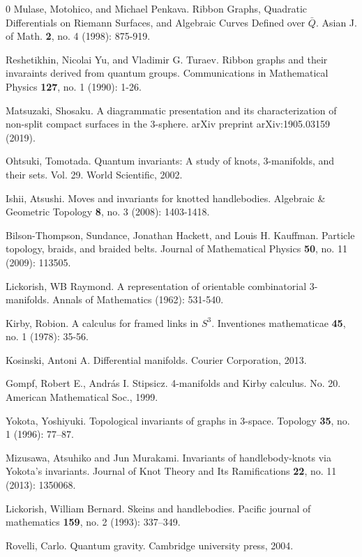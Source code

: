 \documentclass[aps,nofootinbib,amsfonts,superscriptaddress]{revtex4}
\begin{document}
\begin{thebibliography}{0}
Mulase, Motohico, and Michael Penkava. Ribbon Graphs, Quadratic Differentials on Riemann Surfaces, and Algebraic Curves Defined over $\bar Q$. Asian J. of Math. {\bf 2}, no. 4 (1998): 875-919.

Reshetikhin, Nicolai Yu, and Vladimir G. Turaev. Ribbon graphs and their invaraints derived from quantum groups. Communications in Mathematical Physics {\bf 127}, no. 1 (1990): 1-26.

Matsuzaki, Shosaku. A diagrammatic presentation and its characterization of non-split compact surfaces in the 3-sphere. arXiv preprint arXiv:1905.03159 (2019).

Ohtsuki, Tomotada. Quantum invariants: A study of knots, 3-manifolds, and their sets. Vol. 29. World Scientific, 2002.

Ishii, Atsushi. Moves and invariants for knotted handlebodies. Algebraic \& Geometric Topology {\bf 8}, no. 3 (2008): 1403-1418.

Bilson-Thompson, Sundance, Jonathan Hackett, and Louis H. Kauffman. Particle topology, braids, and braided belts. Journal of Mathematical Physics {\bf 50}, no. 11 (2009): 113505.

Lickorish, WB Raymond. A representation of orientable combinatorial 3-manifolds. Annals of Mathematics (1962): 531-540.

  Kirby, Robion. A calculus for framed links in $S^3$. Inventiones mathematicae {\bf 45}, no. 1 (1978): 35-56.

Kosinski, Antoni A. Differential manifolds. Courier Corporation, 2013.

Gompf, Robert E., András I. Stipsicz. 4-manifolds and Kirby calculus. No. 20. American Mathematical Soc., 1999.

Yokota, Yoshiyuki. Topological invariants of graphs in 3-space. Topology {\bf 35}, no. 1 (1996): 77--87.
	
Mizusawa, Atsuhiko and Jun Murakami. Invariants of handlebody-knots via Yokota's invariants. Journal of Knot Theory and Its Ramifications {\bf 22}, no. 11 (2013): 1350068.

Lickorish, William Bernard. Skeins and handlebodies. Pacific journal of mathematics {\bf 159}, no. 2 (1993): 337--349.

Rovelli, Carlo. Quantum gravity. Cambridge university press, 2004.


\end{thebibliography}
\end{document}

